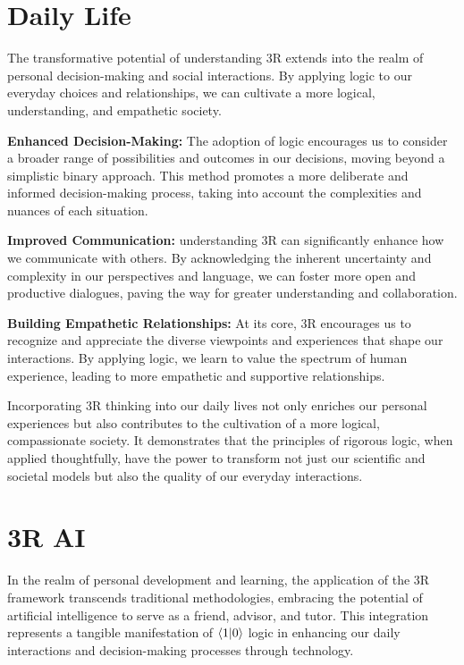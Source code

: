 \documentclass[12pt]{article}
\begin{document}
\section*{Daily Life}

The transformative potential of understanding 3R extends into the realm of personal decision-making and social interactions. By applying \qbit{} logic to our everyday choices and relationships, we can cultivate a more logical, understanding, and empathetic society.

\textbf{Enhanced Decision-Making:} The adoption of \qbit{} logic encourages us to consider a broader range of possibilities and outcomes in our decisions, moving beyond a simplistic binary approach. This method promotes a more deliberate and informed decision-making process, taking into account the complexities and nuances of each situation.

\textbf{Improved Communication:} understanding 3R can significantly enhance how we communicate with others. By acknowledging the inherent uncertainty and complexity in our perspectives and language, we can foster more open and productive dialogues, paving the way for greater understanding and collaboration.

\textbf{Building Empathetic Relationships:} At its core, 3R encourages us to recognize and appreciate the diverse viewpoints and experiences that shape our interactions. By applying \qbit{} logic, we learn to value the spectrum of human experience, leading to more empathetic and supportive relationships.

Incorporating 3R thinking into our daily lives not only enriches our personal experiences but also contributes to the cultivation of a more logical, compassionate society. It demonstrates that the principles of rigorous logic, when applied thoughtfully, have the power to transform not just our scientific and societal models but also the quality of our everyday interactions.

\section*{3R AI}

In the realm of personal development and learning, the application of the 3R framework transcends traditional methodologies, embracing the potential of artificial intelligence to serve as a friend, advisor, and tutor. This integration represents a tangible manifestation of \(\langle 1 | 0 \rangle\) logic in enhancing our daily interactions and decision-making processes through technology.
\end{document}
